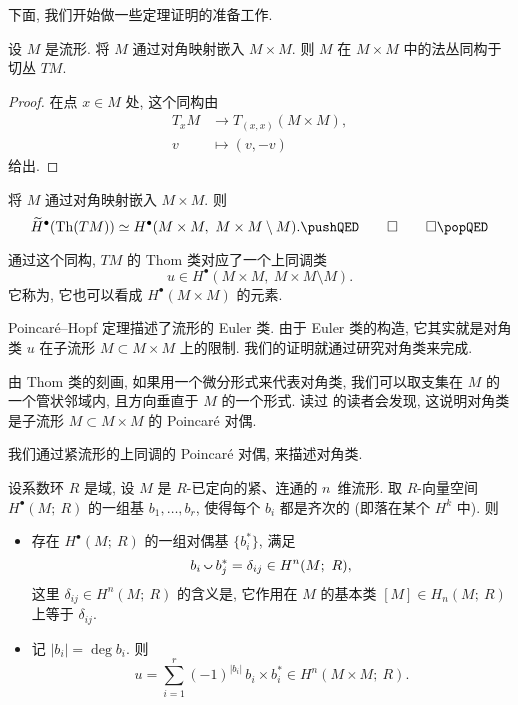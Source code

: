 下面, 我们开始做一些定理证明的准备工作.

\begin{lemma}
    设 $M$ 是流形. 将 $M$ 通过对角映射嵌入 $M \times M$.
    则 $M$ 在 $M \times M$ 中的法丛同构于切丛 $TM$.
\end{lemma}

\begin{proof}
    在点 $x \in M$ 处, 这个同构由
    \[ \begin{aligned}
        T_x M & \to T_{(x, x)} (M \times M), \\
        v & \mapsto (v, -v)
    \end{aligned} \]
    给出.
\end{proof}

\begin{corollary}
    将 $M$ 通过对角映射嵌入 $M \times M$. 则
    \[ \widetilde{H}^\bullet ( \Th (TM) ) \simeq
        H^\bullet ( M \times M,\ M \times M \setminus M ). \thmqedhere \]
\end{corollary}

通过这个同构, $TM$ 的 Thom 类对应了一个上同调类
\[ u \in H^\bullet ( M \times M,\ M \times M \setminus M ) . \]
它称为,
它也可以看成 $H^\bullet (M \times M)$ 的元素.

Poincaré--Hopf 定理描述了流形的 Euler 类.
由于 Euler 类的构造,
它其实就是对角类 $u$ 在子流形 $M \subset M \times M$
上的限制. 我们的证明就通过研究对角类来完成.

\begin{remark}
    由 Thom 类的刻画,
    如果用一个微分形式来代表对角类,
    我们可以取支集在 $M$ 的一个管状邻域内,
    且方向垂直于 $M$ 的一个形式.
    读过 \cite{bott-tu} 的读者会发现, 
    这说明对角类是子流形 $M \subset M \times M$ 的 Poincaré 对偶.
    \varqed
\end{remark}

我们通过紧流形的上同调的 Poincaré 对偶, 来描述对角类.

\begin{theorem} \label{thm-4-poincare-duality}
    设系数环 $R$ 是域, 设 $M$ 是 $R$-已定向的紧、连通的 $n$~维流形.
    取 $R$-向量空间 $H^\bullet (M;\ R)$ 的一组基
    $b_1, \dotsc, b_r$, 使得每个 $b_i$ 都是齐次的 (即落在某个 $H^k$ 中). 则
    \begin{itemize}
        \item
            存在 $H^\bullet (M;\ R)$ 的一组对偶基 $\{ b_i^* \}$, 满足
            \[ b_i \smallcup b_j^* = \delta_{ij} \in H^n (M;\ R), \]
            这里 $\delta_{ij} \in H^n (M;\ R)$ 的含义是,
            它作用在 $M$ 的基本类 $[M] \in H_n (M;\ R)$ 上等于 $\delta_{ij}$.
        \item
            记 $|b_i| = \deg b_i$. 则
            \[ u = \sum_{i = 1}^r (-1)^{|b_i|} \, b_i \times b_i^* \in H^n (M \times M;\ R). \]
    \end{itemize}
\end{theorem}

